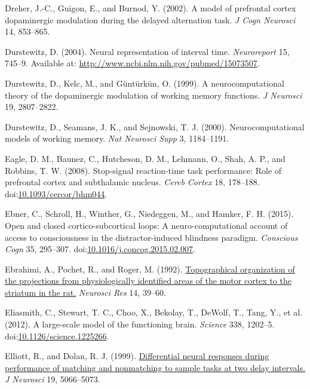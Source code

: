 \documentclass[
  11pt,
  a4paper,
]{scrbook}
\newlength{\cslhangindent}
\newenvironment{CSLReferences}[2] %
 {\begin{list}{}{%
  \setlength{\itemindent}{0pt}
  \setlength{\leftmargin}{0pt}
  \setlength{\parsep}{0pt}
  \ifodd #1
   \setlength{\leftmargin}{\cslhangindent}
   \setlength{\itemindent}{-1\cslhangindent}
  \fi
  \setlength{\itemsep}{#2\baselineskip}}}
 {\end{list}}
\begin{document}
\begin{CSLReferences}{1}{1}
Dreher, J.-C., Guigon, E., and Burnod, Y. (2002). A model of prefrontal
cortex dopaminergic modulation during the delayed alternation task.
\emph{J Cogn Neurosci} 14, 853--865.

Durstewitz, D. (2004). {Neural representation of interval time.}
\emph{Neuroreport} 15, 745--9. Available at:
\url{http://www.ncbi.nlm.nih.gov/pubmed/15073507}.

Durstewitz, D., Kelc, M., and Güntürkün, O. (1999). A neurocomputational
theory of the dopaminergic modulation of working memory functions.
\emph{J Neurosci} 19, 2807--2822.

Durstewitz, D., Seamans, J. K., and Sejnowski, T. J. (2000).
Neurocomputational models of working memory. \emph{Nat Neurosci Supp} 3,
1184--1191.

Eagle, D. M., Baunez, C., Hutcheson, D. M., Lehmann, O., Shah, A. P.,
and Robbins, T. W. (2008). Stop-signal reaction-time task performance:
Role of prefrontal cortex and subthalamic nucleus. \emph{Cereb Cortex}
18, 178--188.
doi:\href{https://doi.org/10.1093/cercor/bhm044}{10.1093/cercor/bhm044}.

Ebner, C., Schroll, H., Winther, G., Niedeggen, M., and Hamker, F. H.
(2015). Open and closed cortico-subcortical loops: A neuro-computational
account of access to consciousness in the distractor-induced blindness
paradigm. \emph{Conscious Cogn} 35, 295--307.
doi:\href{https://doi.org/10.1016/j.concog.2015.02.007}{10.1016/j.concog.2015.02.007}.

Ebrahimi, A., Pochet, R., and Roger, M. (1992).
\href{https://www.ncbi.nlm.nih.gov/pubmed/1380687}{Topographical
organization of the projections from physiologically identified areas of
the motor cortex to the striatum in the rat.} \emph{Neurosci Res} 14,
39--60.

Eliasmith, C., Stewart, T. C., Choo, X., Bekolay, T., DeWolf, T., Tang,
Y., et al. (2012). {A large-scale model of the functioning brain.}
\emph{Science} 338, 1202--5.
doi:\href{https://doi.org/10.1126/science.1225266}{10.1126/science.1225266}.

Elliott, R., and Dolan, R. J. (1999).
\href{https://www.ncbi.nlm.nih.gov/pubmed/10366639}{Differential neural
responses during performance of matching and nonmatching to sample tasks
at two delay intervals.} \emph{J Neurosci} 19, 5066--5073.


\end{CSLReferences}
\end{document}
